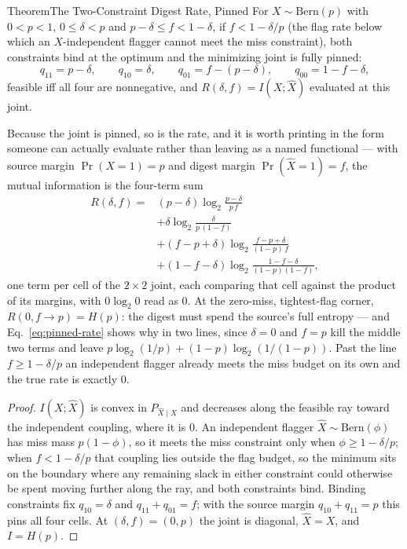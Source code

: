 \documentclass[11pt,a4paper]{article}
\theoremstyle{definition}
\theoremstyle{plain}
\begin{document}
\begin{pdclaim}{Theorem}{The Two-Constraint Digest Rate, Pinned}
\setlength{\parskip}{4pt plus 1pt}
\label{thm:pinned-joint}
For $X\sim\mathrm{Bern}(p)$ with $0<p<1$, $0\le\delta<p$ and $p-\delta\le f<1-\delta$, if
$f<1-\delta/p$ (the flag rate below which an $X$-independent flagger cannot meet
the miss constraint), both constraints bind at the optimum and the minimizing joint
is fully pinned:
\[
q_{11}=p-\delta,\qquad q_{10}=\delta,\qquad q_{01}=f-(p-\delta),\qquad
q_{00}=1-f-\delta,
\]
feasible iff all four are nonnegative, and $R(\delta,f)=I(X;\hat X)$ evaluated at
this joint.

Because the joint is pinned, so is the rate, and it is worth printing
in the form someone can actually evaluate rather than leaving as a named
functional --- with source margin $\Pr(X{=}1)=p$ and digest margin
$\Pr(\hat X{=}1)=f$, the mutual information is the four-term sum
\begin{equation}\label{eq:pinned-rate}
\begin{split}
R(\delta,f) ={}&(p-\delta)\log_2\frac{p-\delta}{p\,f} \\[
2pt]
&+\delta\log_2\frac{\delta}{p\,(1-f)} \\[2pt]
&+(f-p+\delta)\log_2\frac{f-p+\delta}{(1-p)\,f} \\[2pt]
&+(1-f-\delta)\log_2\frac{1-f-\delta}{(1-p)(1-f)},
\end{split}
\end{equation}
one term per cell of the $2\times2$ joint, each comparing that cell against the
product of its margins, with $0\log_2 0$ read as $0$.
At the zero-miss,
tightest-flag corner, $R(0,f{\to}p)=H(p)$: the digest
must spend the source's full entropy --- and Eq.~\ref{eq:pinned-rate} shows why in
two lines, since $\delta=0$ and $f=p$ kill the middle two terms and leave
$p\log_2(1/p)+(1-p)\log_2(1/(1-p))$.
Past the line $f\ge 1-\delta/p$ an independent
flagger already meets the miss budget on its own and the true rate is exactly $0$.
\end{pdclaim}
\begin{proof}
\setlength{\parskip}{4pt plus 1pt}
$I(X;\hat X)$ is convex in $P_{\hat X\mid X}$ and decreases along the feasible ray
toward the independent coupling, where it is $0$. An independent flagger
$\hat X\sim\mathrm{Bern}(\phi)$ has miss mass $p(1-\phi)$, so it meets the miss
constraint only when $\phi\ge 1-\delta/p$; when $f<1-\delta/p$ that coupling lies
outside the flag budget, so the minimum sits on the boundary where any remaining
slack in either constraint could otherwise be spent moving further along the ray,
and both constraints bind.
Binding constraints fix $q_{10}=\delta$ and
$q_{11}+q_{01}=f$; with the source margin $q_{10}+q_{11}=p$ this pins all four
cells.
At $(\delta,f)=(0,p)$ the joint is diagonal, $\hat X=X$, and $I=H(p)$.
\end{proof}
\end{document}
